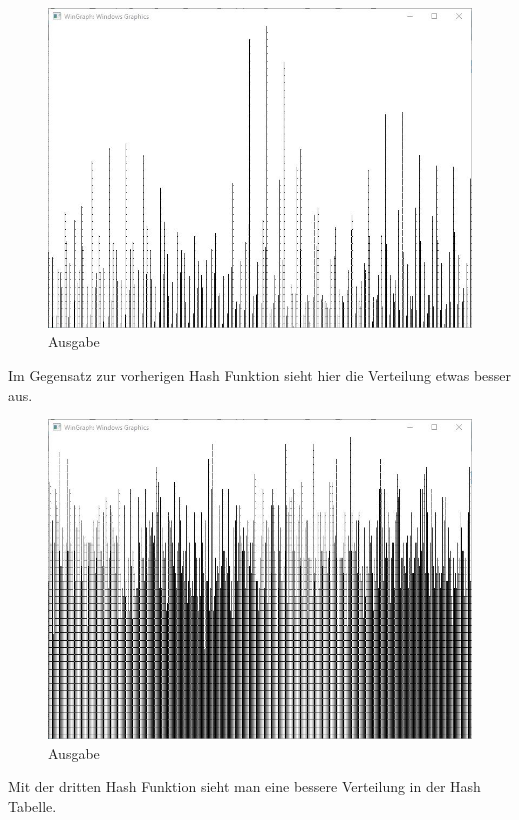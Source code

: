 \documentclass[a4papr,12pt]{article}
\begin{document}
\begin{figure}[H]
	\centering
	\includegraphics[scale=0.65]{./pictures/better.jpg}
	\caption{Ausgabe}
	\label{fig: BetterHash}
\end{figure}
Im Gegensatz zur vorherigen Hash Funktion sieht hier die Verteilung etwas besser aus.

\begin{figure}[H]
	\centering
	\includegraphics[scale=0.65]{./pictures/best.jpg}
	\caption{Ausgabe}
	\label{fig: BestHash}
\end{figure}
Mit der dritten Hash Funktion sieht man eine bessere Verteilung in der Hash Tabelle.
\end{document}
